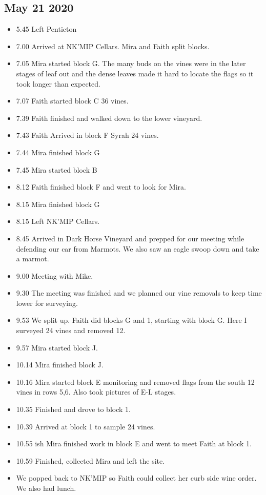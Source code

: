 \documentclass[11pt,letter]{article}
\newenvironment{smitemize}{
\begin{itemize}
  \setlength{\itemsep}{0pt}
  \setlength{\parskip}{0.8pt}
  \setlength{\parsep}{0pt}}
{\end{itemize}
}
\begin{document}
\subsection {May 21 2020}
\begin{smitemize}
\item 5.45 Left Penticton 
\item 7.00 Arrived at NK'MIP Cellars. Mira and Faith split blocks.
\item 7.05 Mira started block G. The many buds on the vines were in the later stages of leaf out and the dense leaves made it hard to locate the flags so it took longer than expected.
\item 7.07 Faith started block C 36 vines.
\item 7.39 Faith finished and walked down to the lower vineyard. 
\item 7.43 Faith Arrived in block F Syrah 24 vines. 
\item 7.44 Mira finished block G
\item 7.45 Mira started block B
\item 8.12 Faith finished block F and went to look for Mira.
\item 8.15 Mira finished block G
\item 8.15 Left NK'MIP Cellars.
\item 8.45 Arrived in Dark Horse Vineyard and prepped for our meeting while defending our car from Marmots. We also saw an eagle swoop down and take a marmot.
\item 9.00 Meeting with Mike. 
\item 9.30 The meeting was finished and we planned our vine removals to keep time lower for surveying.
\item 9.53 We split up. Faith did blocks G and 1, starting with block G. Here I surveyed 24 vines and removed 12.  
\item 9.57 Mira started block J.
\item 10.14 Mira finished block J.
\item 10.16 Mira started block E monitoring and removed flags from the south 12 vines in rows 5,6. Also took pictures of E-L stages.
\item 10.35 Finished and drove to block 1.
\item 10.39 Arrived at block 1 to sample 24 vines.
\item 10.55 ish Mira finished work in block E and went to meet Faith at block 1.
\item 10.59 Finished, collected Mira and left the site.
\item We popped back to NK'MIP so Faith could collect her curb side wine order. We also had lunch. 

\end{smitemize}
\end{document}
